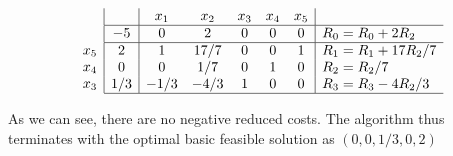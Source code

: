 $$
\begin{array}{c}
\\
\\
x_5\\
x_4 \\
x_3 \\ 
\end{array}
\begin{array}{|c|ccccc|l}
     & x_1 & x_2 & x_3 & x_4 & x_5  \\ \hline
   -5 & 0 & 2 & 0 & 0 & 0 & R_0 = R_0 + 2R_2\\ \hline
   2 & 1 & 17/7 & 0  & 0  & 1 & R_1 = R_1 + 17R_2/7\\
   0 & 0 & 1/7 & 0 & 1 & 0  & R_2 = R_2/7\\
   1/3 & -1/3 & -4/3 & 1 & 0 & 0 & R_3 = R_3 - 4R_2/3 \\ \hline
\end{array}
$$

As we can see, there are no negative reduced costs. The algorithm thus terminates with the optimal basic feasible solution as $(0,0,1/3,0,2)$